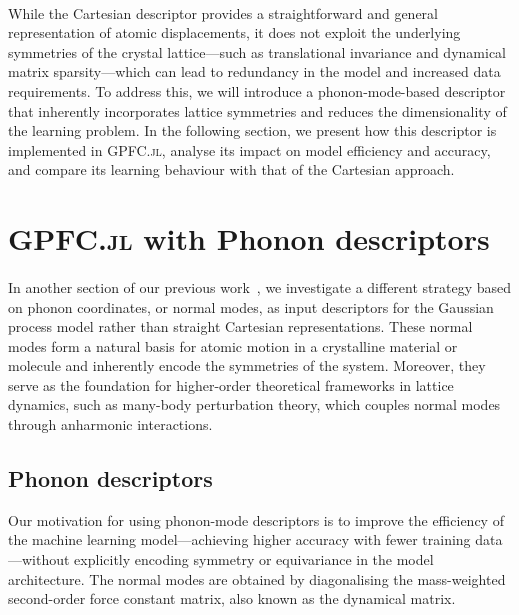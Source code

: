 \paragraph{}
While the Cartesian descriptor provides a straightforward and general representation of atomic displacements, it does not exploit the underlying symmetries of the crystal lattice—such as translational invariance and dynamical matrix sparsity—which can lead to redundancy in the model and increased data requirements. To address this, we will introduce a phonon-mode-based descriptor that inherently incorporates lattice symmetries and reduces the dimensionality of the learning problem.
In the following section, we present how this descriptor is implemented in \textsc{GPFC.jl}, analyse its impact on model efficiency and accuracy, and compare its learning behaviour with that of the Cartesian approach.

\newpage
\section{\textsc{GPFC.jl} with Phonon descriptors} \label{sec:3.2}
\paragraph{}
In another section of our previous work~\cite{https://doi.org/10.48550/arxiv.2405.05113}, we investigate a different strategy based on phonon coordinates, or normal modes, as input descriptors for the Gaussian process model rather than straight Cartesian representations.
These normal modes form a natural basis for atomic motion in a crystalline material or molecule and inherently encode the symmetries of the system.
Moreover, they serve as the foundation for higher-order theoretical frameworks in lattice dynamics, such as many-body perturbation theory, which couples normal modes through anharmonic interactions.

\subsection{Phonon descriptors} \label{subsec:3.2.1}
Our motivation for using phonon-mode descriptors is to improve the efficiency of the machine learning model—achieving higher accuracy with fewer training data—without explicitly encoding symmetry or equivariance in the model architecture. The normal modes are obtained by diagonalising the mass-weighted second-order force constant matrix, also known as the dynamical matrix.

